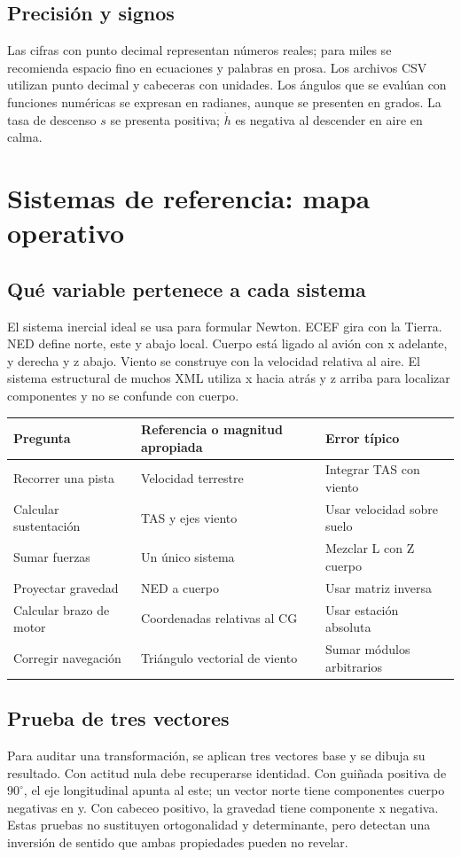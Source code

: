 \section{Precisión y signos}
Las cifras con punto decimal representan números reales; para miles se recomienda espacio fino en ecuaciones y palabras en prosa. Los archivos CSV utilizan punto decimal y cabeceras con unidades. Los ángulos que se evalúan con funciones numéricas se expresan en radianes, aunque se presenten en grados. La tasa de descenso $s$ se presenta positiva; $\dot h$ es negativa al descender en aire en calma.

\chapter{Sistemas de referencia: mapa operativo}
\section{Qué variable pertenece a cada sistema}
El sistema inercial ideal se usa para formular Newton. ECEF gira con la Tierra. NED define norte, este y abajo local. Cuerpo está ligado al avión con x adelante, y derecha y z abajo. Viento se construye con la velocidad relativa al aire. El sistema estructural de muchos XML utiliza x hacia atrás y z arriba para localizar componentes y no se confunde con cuerpo.

\begin{center}\begin{tabular}{lll}\toprule
Pregunta&Referencia o magnitud apropiada&Error típico\\\midrule
Recorrer una pista&Velocidad terrestre&Integrar TAS con viento\\
Calcular sustentación&TAS y ejes viento&Usar velocidad sobre suelo\\
Sumar fuerzas&Un único sistema&Mezclar L con Z cuerpo\\
Proyectar gravedad&NED a cuerpo&Usar matriz inversa\\
Calcular brazo de motor&Coordenadas relativas al CG&Usar estación absoluta\\
Corregir navegación&Triángulo vectorial de viento&Sumar módulos arbitrarios\\\bottomrule
\end{tabular}\end{center}

\section{Prueba de tres vectores}
Para auditar una transformación, se aplican tres vectores base y se dibuja su resultado. Con actitud nula debe recuperarse identidad. Con guiñada positiva de $90^\circ$, el eje longitudinal apunta al este; un vector norte tiene componentes cuerpo negativas en y. Con cabeceo positivo, la gravedad tiene componente x negativa. Estas pruebas no sustituyen ortogonalidad y determinante, pero detectan una inversión de sentido que ambas propiedades pueden no revelar.

